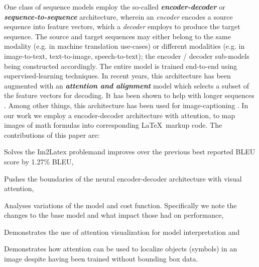 \documentclass{article}
\begin{document}
One class of sequence models employ the so-called \textbf{\emph{encoder-decoder}} \cite{Cho2014LearningPR} or \textbf{\emph{sequence-to-sequence}}  \cite{Sutskever2014SequenceTS} architecture, wherein an \emph{encoder} encodes a source sequence into feature vectors, which a \emph{decoder} employs to produce the target sequence. The source and target sequences may either belong to the same modality (e.g. in machine translation use-cases) or different modalities (e.g. in image-to-text, text-to-image, speech-to-text); the encoder / decoder sub-models being constructed accordingly. The entire model is trained end-to-end using supervised-learning techniques. In recent years, this architecture has been augmented with an \textbf{\emph{attention and alignment }} model which selects a subset of the feature vectors for decoding. It has been shown to help with longer sequences \cite{Bahdanau2014NeuralMT, DBLP:journals/corr/LuongPM15}. Among other things, this architecture has been used for image-captioning \cite{Xu2015ShowAA}.
In our work we employ a encoder-decoder architecture with attention, to map images of math formulas into corresponding \LaTeX ~markup code.
The contributions of this paper are:
\begin{enumerate*}[label=\arabic*)]
	\item Solves the Im2Latex problem\footnotemark[100] and improves over the previous best reported BLEU score by 1.27\% BLEU, 
	\item Pushes the boundaries of the neural encoder-decoder architecture with visual attention, 
	\item Analyses variations of the model and cost function. Specifically we note the changes to the base model \cite{Xu2015ShowAA} and what impact those had on performance,  
	\item Demonstrates the use of attention visualization for model interpretation and
	\item Demonstrates how attention can be used to localize objects (symbols) in an image despite having been trained without bounding box data.
\end{enumerate*}
\end{document}
